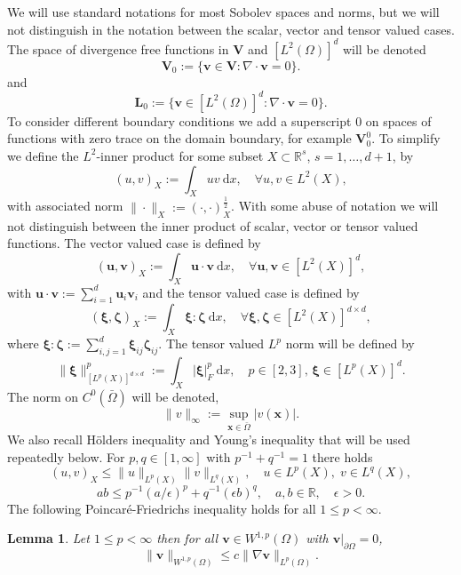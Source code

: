 \documentclass[10pt]{amsart}
\numberwithin{equation}{section}
\newtheorem{lemma}[theorem]{Lemma}
\theoremstyle{definition}
\theoremstyle{remark}
\newcommand{\bxi}{\bld{\xi}}
\renewcommand{\(}{\bigl(}
\renewcommand{\)}{\bigr)}
\newcommand{\bld}[1]{\boldsymbol{#1}}
\newcommand{\bv}{\bld{v}}
\newcommand{\bu}{\bld{u}}
\newcommand{\bV}{\bld{V}}
\newcommand{\bzeta}{\bld{\zeta}}
\newcommand{\bx}{\bld{x}}
\newcommand{\bL}{\bld{L}}
\begin{document}
We will use standard notations for most Sobolev spaces and norms, but we will 
not distinguish in the notation between the scalar,
vector and tensor valued cases. The space of divergence free functions
in $\bV$ and $[L^2(\Omega)]^d$ will be denoted
\[
\bV_0 := \{\bv \in \bV : \nabla \cdot \bv = 0\}.
\]
and
\[
\bL_0 := \{\bv \in [L^2(\Omega)]^d: \nabla \cdot \bv = 0\}.
\]
To consider different boundary conditions we add a superscript $0$ on
spaces of functions with zero trace on the domain
boundary, for example
$\bV^0_0$.
To simplify we define the $L^2$-inner product for some subset $X \subset
\mathbb{R}^s$, $s=1,\hdots,d+1$, by
\[
(u,v)_X := \int_X u v ~\mbox{d}x, \quad \forall u,v \in L^2(X),
\]
with associated norm $\|\cdot\|_X := (\cdot,\cdot)^{\frac12}_X$.
With some abuse of notation we will not distinguish between the inner
product of scalar, vector or tensor valued functions. The vector
valued case is defined by
\[
(\bu,\bv)_X := \int_X \bu \cdot \bv ~\mbox{d}x, \quad \forall \bu,\bv \in [L^2(X)]^d,
\]
with $\bu \cdot \bv := \sum_{i=1}^d \bu_i \bv_i$
and the tensor valued case is defined by
\[
(\bxi, \bzeta)_X := \int_X \bxi : \bzeta ~\mbox{d}x, \quad \forall \bxi, \bzeta\in
[L^2(X)]^{d\times d},
\]
where $\bxi : \bzeta := \sum_{i,j=1}^d \bxi_{ij} \bzeta_{ij}$. The tensor valued $L^p$ norm will be
defined by
\begin{equation}\label{eq:Lpdef}
\|\bxi\|^p_{[L^p(X)]^{d\times d}}:= \int_X |\bxi|_F^p ~\mbox{d}
x,\quad p \in [2,3], \, \bxi \in [L^p(X)]^d.
\end{equation}
The norm on $C^0(\bar \Omega)$ will be denoted,
\[
\|v\|_\infty := \sup_{\bx \in \bar \Omega} |v(\bx)|.
\]
We also recall H\"olders inequality and Young's inequality that will
be used repeatedly below. For $p,q \in [1,\infty]$ with $p^{-1} +
q^{-1} = 1$ there holds
\begin{equation}\label{eq:holder}
(u,v)_{X} \leq \|u\|_{L^p(X)} \|v\|_{L^q(X)}, \quad u
\in L^p(X), \; v
\in L^q(X),
\end{equation}
\begin{equation}\label{eq:young}
a b \leq p^{-1} (a/\epsilon) ^p + q^{-1} (\epsilon b)^q,\quad a,b
\in \mathbb{R},\quad \epsilon >0.
\end{equation}
The following Poincar\'e-Friedrichs inequality holds for all $1\leq  p <
\infty$.
\begin{lemma}\label{lem:PF}
Let $1\leq  p <
\infty$ then for all $\bv \in W^{1,p}(\Omega)$ with
$\bv\vert_{\partial \Omega} = 0$, 
\[
\|\bv\|_{W^{1,p}(\Omega)} \leq c \|\nabla \bv\|_{L^p(\Omega)}.
\]
\end{lemma}
\end{document}
